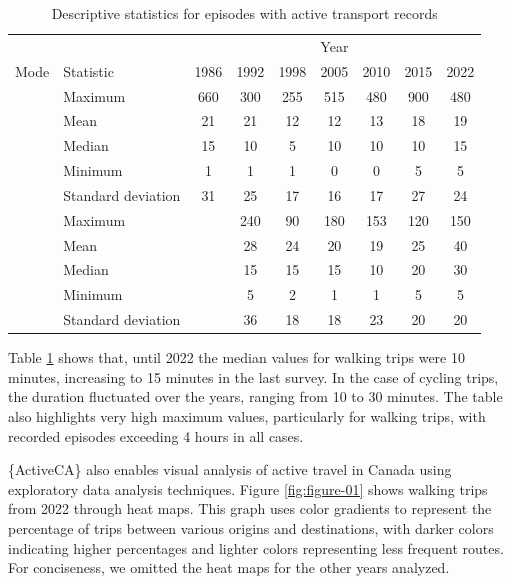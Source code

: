 \documentclass[Royal,times,sageh]{sagej}
\begin{document}
\begin{longtable}[t]{>{}llccccccc}
\caption{\label{tab:table-01}\label{tab:table-01}Descriptive statistics for episodes with active transport records}\\
\toprule
\multicolumn{2}{c}{ } & \multicolumn{7}{c}{Year} \\
\cmidrule(l{3pt}r{3pt}){3-9}
Mode & Statistic & 1986 & 1992 & 1998 & 2005 & 2010 & 2015 & 2022\\
\midrule
 & Maximum & 660 & 300 & 255 & 515 & 480 & 900 & 480\\
\nopagebreak
 & Mean & 21 & 21 & 12 & 12 & 13 & 18 & 19\\
\nopagebreak
 & Median & 15 & 10 & 5 & 10 & 10 & 10 & 15\\
\nopagebreak
 & Minimum & 1 & 1 & 1 & 0 & 0 & 5 & 5\\
\nopagebreak
\multirow[t]{-5}{*}{\raggedright\arraybackslash \textbf{Walking}} & Standard deviation & 31 & 25 & 17 & 16 & 17 & 27 & 24\\
\cmidrule{1-9}\pagebreak[0]
 & Maximum &  & 240 & 90 & 180 & 153 & 120 & 150\\
\nopagebreak
 & Mean &  & 28 & 24 & 20 & 19 & 25 & 40\\
\nopagebreak
 & Median &  & 15 & 15 & 15 & 10 & 20 & 30\\
\nopagebreak
 & Minimum &  & 5 & 2 & 1 & 1 & 5 & 5\\
\nopagebreak
\multirow[t]{-5}{*}{\raggedright\arraybackslash \textbf{Cycling}} & Standard deviation &  & 36 & 18 & 18 & 23 & 20 & 20\\
\bottomrule
\end{longtable}
\endgroup{}

Table \ref{tab:table-01} shows that, until 2022 the median values for
walking trips were 10 minutes, increasing to 15 minutes in the last
survey. In the case of cycling trips, the duration fluctuated over the
years, ranging from 10 to 30 minutes. The table also highlights very
high maximum values, particularly for walking trips, with recorded
episodes exceeding 4 hours in all cases.

\{ActiveCA\} also enables visual analysis of active travel in Canada
using exploratory data analysis techniques. Figure \ref{fig:figure-01}
shows walking trips from 2022 through heat maps. This graph uses color
gradients to represent the percentage of trips between various origins
and destinations, with darker colors indicating higher percentages and
lighter colors representing less frequent routes. For conciseness, we
omitted the heat maps for the other years analyzed.
\end{document}
